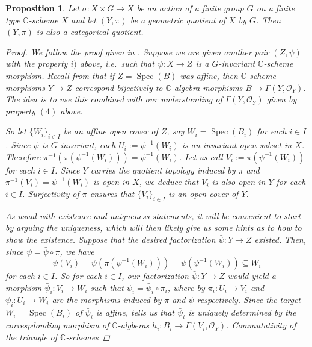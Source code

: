 \documentclass[12pt,a4paper]{amsart}
\theoremstyle{plain}
\newtheorem{prop}[thm]{Proposition}
\theoremstyle{definition}
\theoremstyle{remark}
\begin{document}
\begin{prop}
  Let $\sigma \colon X \times G \to X$ be an action of a finite group $G$ on a finite type $\mathbb{C}$-scheme $X$ and let $(Y, \pi)$ be a geometric quotient of $X$ by $G$.
  Then $(Y, \pi)$ is also a categorical quotient.

  \begin{proof}
    We follow the proof given in \cite[Proposition 0.1]{mfk94}.
    Suppose we are given another pair $(Z, \psi)$ with the property $i)$ above, i.e.~such that $\psi \colon X \to Z$ is a $G$-invariant $\mathbb{C}$-scheme morphism.
    Recall from \cite[Exercise II.2.4]{har77} that if $Z = \operatorname{Spec}(B)$ was affine, then $\mathbb{C}$-scheme morphisms $Y \to Z$ correspond bijectively to $\mathbb{C}$-algebra morphisms $B \to \Gamma(Y,\mathscr{O}_{Y})$.
    The idea is to use this combined with our understanding of $\Gamma(Y,\mathscr{O}_{Y})$ given by property $(4)$ above.

    So let $\{ W_{i} \}_{i \in I}$ be an affine open cover of $Z$, say $W_{i} = \operatorname{Spec}(B_{i})$ for each $i \in I$.
    Since $\psi$ is $G$-invariant, each $U_{i} := \psi^{-1}(W_{i})$ is an invariant open subset in $X$.
    Therefore $\pi^{-1}(\pi(\psi^{-1}(W_{i}))) = \psi^{-1}(W_{i})$.
    Let us call $V_{i} := \pi(\psi^{-1}(W_{i}))$ for each $i \in I$.
    Since $Y$ carries the quotient topology induced by $\pi$ and $\pi^{-1}(V_{i}) = \psi^{-1}(W_{i})$ is open in $X$, we deduce that $V_{i}$ is also open in $Y$ for each $i \in I$.
    Surjectivity of $\pi$ ensures that $\{ V_{i} \}_{i \in I}$ is an open cover of $Y$.

    As usual with existence and uniqueness statements, it will be convenient to start by arguing the uniqueness, which will then likely give us some hints as to how to show the existence.
    Suppose that the desired factorization $\bar{\psi} \colon Y \to Z$ existed.
    Then, since $\psi = \bar{\psi} \circ \pi$, we have
    \[ \bar{\psi}(V_{i}) = \bar{\psi}(\pi(\psi^{-1}(W_{i}))) = \psi(\psi^{-1}(W_{i})) \subseteq W_{i} \]
    for each $i \in I$.
    So for each $i \in I$, our factorization $\bar{\psi} \colon Y \to Z$ would yield a morphism $\bar{\psi}_{i} \colon V_{i} \to W_{i}$ such that $\psi_{i} = \bar{\psi}_{i} \circ \pi_{i}$, where by $\pi_{i} \colon U_{i} \to V_{i}$ and $\psi_{i} \colon U_{i} \to W_{i}$ are the morphisms induced by $\pi$ and $\psi$ respectively.
    Since the target $W_{i} = \operatorname{Spec}(B_{i})$ of $\bar{\psi}_{i}$ is affine, \cite[Exercise II.2.4]{har77} tells us that $\bar{\psi}_{i}$ is uniquely determined by the correspdonding morphism of $\mathbb{C}$-algberas $h_{i} \colon B_{i} \to \Gamma(V_{i}, \mathscr{O}_{Y})$.
    Commutativity of the triangle of $\mathbb{C}$-schemes
    

\end{proof}
\end{prop}
\end{document}
